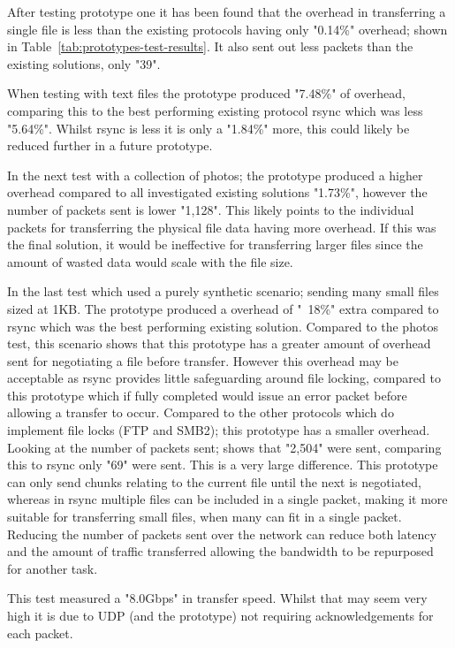 After testing prototype one it has been found that the overhead in transferring a single file is less than the existing protocols having only "0.14\%" overhead; shown in Table~\ref{tab:prototypes-test-results}. It also sent out less packets than the existing solutions, only "39".

When testing with text files the prototype produced "7.48\%" of overhead, comparing this to the best performing existing protocol rsync which was less "5.64\%". Whilst rsync is less it is only a
"1.84\%" more, this could likely be reduced further in a future prototype.

In the next test with a collection of photos; the prototype produced a higher overhead compared to all investigated existing solutions "1.73\%", however the number of packets sent is lower "1,128". This likely points to the individual packets for transferring the physical file data having more overhead. If this was the final solution, it would be ineffective for transferring larger files since the amount of wasted data would scale with the file size.

In the last test which used a purely synthetic scenario; sending many small files sized at 1KB. The prototype produced a overhead of "~18\%" extra compared to rsync which was the best performing existing solution. Compared to the photos test, this scenario shows that this prototype has a greater amount of overhead sent for negotiating a file before transfer. However this overhead may be acceptable as rsync provides little safeguarding around file locking, compared to this prototype which if fully completed would issue an error packet before allowing a transfer to occur. Compared to the other protocols which do implement file locks (FTP and SMB2); this prototype has a smaller overhead. Looking at the number of packets sent; shows that "2,504" were sent, comparing this to rsync only "69" were sent. This is a very large difference. This prototype can only send chunks relating to the current file until the next is negotiated, whereas in rsync multiple files can be included in a single packet, making it more suitable for transferring small files, when many can fit in a single packet. Reducing the number of packets sent over the network can reduce both latency and the amount of traffic transferred allowing the bandwidth to be repurposed for another task.

This test measured a "8.0Gbps" in transfer speed. Whilst that may seem very high it is due to UDP (and the prototype) not requiring acknowledgements for each packet.

